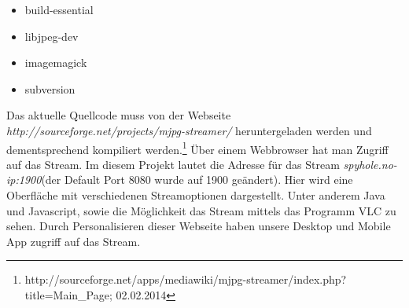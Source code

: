 \begin{itemize}
  \item build-essential
  \item libjpeg-dev
  \item imagemagick
  \item subversion
\end{itemize}

Das aktuelle Quellcode muss von der Webseite \textit{http://sourceforge.net/projects/mjpg-streamer/} heruntergeladen werden und dementsprechend kompiliert werden.\footnote{http://sourceforge.net/apps/mediawiki/mjpg-streamer/index.php?title=Main\_Page; 02.02.2014} Über einem Webbrowser hat man Zugriff auf das Stream. Im diesem Projekt lautet die Adresse für das Stream \textit{spyhole.no-ip:1900}(der Default Port 8080 wurde auf 1900 geändert). Hier wird eine Oberfläche mit verschiedenen Streamoptionen dargestellt. Unter anderem Java und Javascript, sowie die Möglichkeit das Stream mittels das Programm VLC zu sehen. Durch Personalisieren dieser Webseite haben unsere Desktop und Mobile App zugriff auf das Stream.
